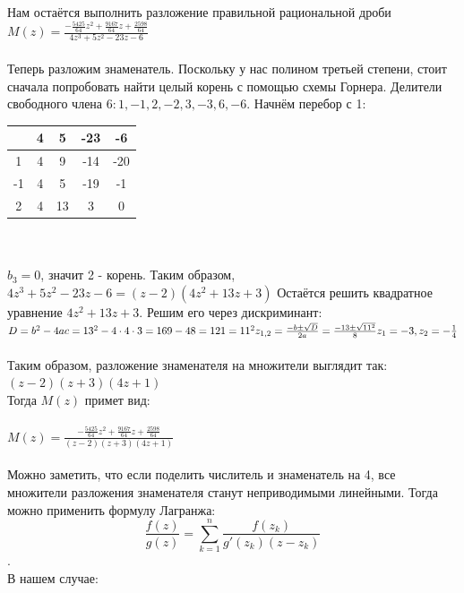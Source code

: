 \documentclass[12pt, a4paper]{article}
\begin{document}
Нам остаётся выполнить разложение правильной рациональной дроби\\
$M(z) = \frac{-\frac{5425}{64}z^2 + \frac{9167}{64}z + \frac{2598}{64}}
{4z^3 + 5z^2 - 23z - 6}$\\\\
Теперь разложим знаменатель. Поскольку у нас полином третьей степени,
стоит сначала попробовать найти целый корень с помощью схемы Горнера.
Делители свободного члена
$6: 1, -1, 2, -2, 3, -3, 6, -6$. Начнём перебор с 1:\\
\begin{tabular}{|c|c|c|c|c|}
    \hline
       & 4 & 5  & -23 & -6  \\
    \hline
    1  & 4 & 9  & -14 & -20 \\
    \hline
    -1 & 4 & 5  & -19 & -1  \\
    \hline
    2  & 4 & 13 & 3   & 0   \\
    \hline
\end{tabular}\\\\
$b_3 = 0$, значит 2 - корень. Таким образом,\\
$4z^3 + 5z^2 - 23z - 6 = (z - 2)(4z^2 + 13z + 3)$
Остаётся решить квадратное уравнение $4z^2 + 13z + 3$. Решим его
через дискриминант:\\
\begin{math}
    D = b^2 - 4ac = 13^2 - 4\cdot4\cdot3 = 169 - 48 = 121 = 11^2\\
    z_{1,2} = \frac{-b\pm \sqrt{D}}{2a} = \frac{-13\pm \sqrt{11^2}}{8}\\
    z_1 = -3, z_2 = -\frac{1}{4}
\end{math}\\\\
Таким образом, разложение знаменателя на множители выглядит так:\\
$(z - 2)(z + 3)(4z + 1)$\\
Тогда $M(z)$ примет вид:\\\\
$M(z) = \frac{-\frac{5425}{64}z^2 + \frac{9167}{64}z + \frac{2598}{64}}
{(z - 2)(z + 3)(4z + 1)}$\\\\
Можно заметить, что если поделить числитель и знаменатель на 4, все множители
разложения знаменателя станут неприводимыми линейными. Тогда можно применить
формулу Лагранжа:\\
\[ \frac{f(z)}{g(z)} = \sum_{k=1}^{n} \frac{f(z_k)}{g'(z_k)(z-z_k)} \].\\
В нашем случае:
\end{document}
